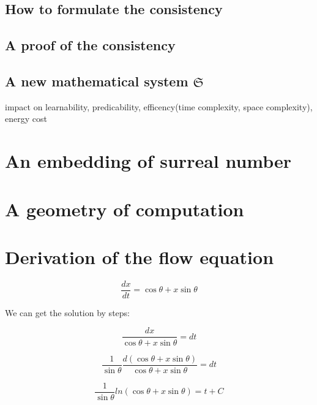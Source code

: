 \documentclass{article}
\begin{document}
\subsection{How to formulate the consistency}

\subsection{A proof of the consistency}

\subsection{A new mathematical system $\mathfrak{S}$}

impact on learnability, predicability, efficency(time complexity, space complexity), energy cost

\newpage

\section{An embedding of surreal number}\label{sec:aeosn}

\section{A geometry of computation}\label{sec:gioc}

\newpage



\newpage
\appendix

\section{Derivation of the flow equation}

\begin{equation}
    \frac{dx}{dt} = \cos \theta + x \sin \theta
\end{equation}

We can get the solution by steps:

\begin{equation}
    \frac{dx}{\cos \theta + x \sin \theta} = dt
\end{equation}

\begin{equation}
    \frac{1}{\sin \theta} \frac{d(\cos \theta + x \sin \theta)}{\cos \theta + x \sin \theta} = dt
\end{equation}

\begin{equation}
    \frac{1}{\sin \theta} ln(\cos \theta + x \sin \theta) = t + C
\end{equation}
\end{document}
